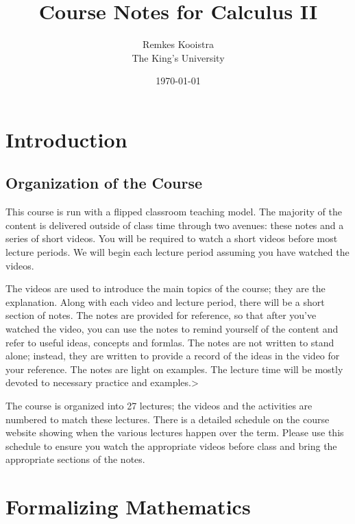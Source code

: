 \documentclass[fleqn]{report}
\begin{document}
\title{Course Notes for Calculus II}
\author{Remkes Kooistra \\
	The King's University}
\date{\today}	

\maketitle

\setcounter{tocdepth}{1}
\tableofcontents

\chapter{Introduction}
\label{introduction}

\section{Organization of the Course}
\label{organization}

This course is run with a flipped classroom teaching model.
The majority of the content is delivered outside of class time
through two avenues: these notes and a series of short videos.
You will be required to watch a short videos before most
lecture periods. We will begin each lecture period assuming
you have watched the videos.

The videos are used to introduce the main topics of the
course; they are the explanation. Along with each video and
lecture period, there will be a short section of notes. The
notes are provided for reference, so that after you've watched
the video, you can use the notes to remind yourself of the
content and refer to useful ideas, concepts and formlas. The
notes are not written to stand alone; instead, they are
written to provide a record of the ideas in the video for your
reference. The notes are light on examples. The lecture time
will be mostly devoted to necessary practice and examples.>

The course is organized into 27 lectures; the videos and the
activities are numbered to match these lectures. There is a
detailed schedule on the course website showing when the
various lectures happen over the term. Please use this
schedule to ensure you watch the appropriate videos before
class and bring the appropriate sections of the notes.

\chapter{Formalizing Mathematics}
\label{formalizing}
\end{document}
